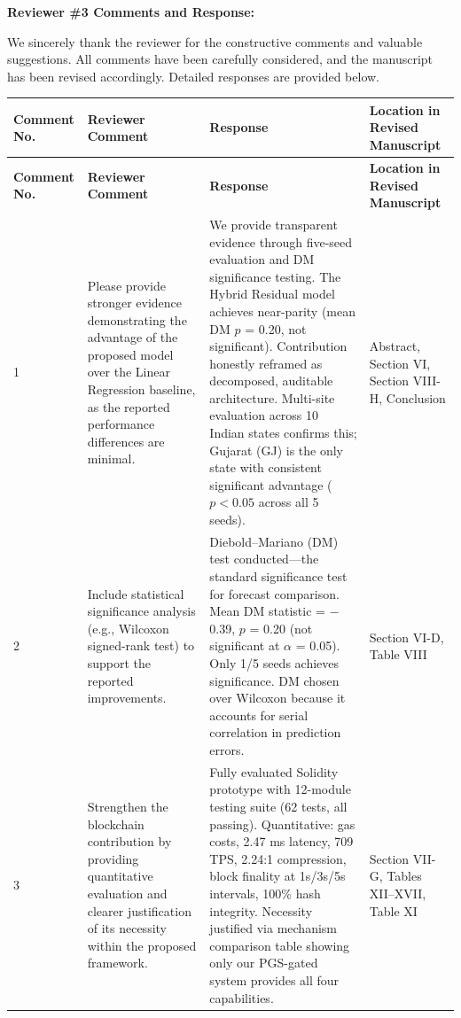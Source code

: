 \documentclass[11pt,a4paper]{article}
\begin{document}
\vspace{1em}

{\large \textbf{Reviewer \#3 Comments and Response:}}

\vspace{0.5em}
We sincerely thank the reviewer for the constructive comments and valuable suggestions. All comments have been carefully considered, and the manuscript has been revised accordingly. Detailed responses are provided below.

\vspace{0.5em}

\begin{longtable}{|p{1.5cm}|p{3.5cm}|p{6.2cm}|p{2.8cm}|}
\hline
\textbf{Comment No.} & \textbf{Reviewer Comment } & \textbf{Response} & \textbf{Location in Revised Manuscript} \\
\hline
\endfirsthead
\hline
\textbf{Comment No.} & \textbf{Reviewer Comment } & \textbf{Response} & \textbf{Location in Revised Manuscript} \\
\hline
\endhead

1 & Please provide stronger evidence demonstrating the advantage of the proposed model over the Linear Regression baseline, as the reported performance differences are minimal. & We provide transparent evidence through five-seed evaluation and DM significance testing. The Hybrid Residual model achieves near-parity (mean DM $p$ = 0.20, not significant). Contribution honestly reframed as decomposed, auditable architecture. Multi-site evaluation across 10 Indian states confirms this; Gujarat (GJ) is the only state with consistent significant advantage ($p < 0.05$ across all 5 seeds). & Abstract, Section VI, Section VIII-H, Conclusion \\
\hline

2 & Include statistical significance analysis (e.g., Wilcoxon signed-rank test) to support the reported improvements. & Diebold--Mariano (DM) test conducted---the standard significance test for forecast comparison. Mean DM statistic = $-$0.39, $p$ = 0.20 (not significant at $\alpha$ = 0.05). Only 1/5 seeds achieves significance. DM chosen over Wilcoxon because it accounts for serial correlation in prediction errors. & Section VI-D, Table VIII \\
\hline

3 & Strengthen the blockchain contribution by providing quantitative evaluation and clearer justification of its necessity within the proposed framework. & Fully evaluated Solidity prototype with 12-module testing suite (62 tests, all passing). Quantitative: gas costs, 2.47 ms latency, 709 TPS, 2.24:1 compression, block finality at 1s/3s/5s intervals, 100\% hash integrity. Necessity justified via mechanism comparison table showing only our PGS-gated system provides all four capabilities. & Section VII-G, Tables XII--XVII, Table XI \\
\hline


\end{longtable}
\end{document}
